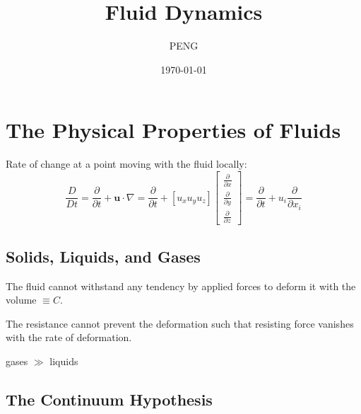\documentclass{article}
\title{Fluid Dynamics}
\author{PENG}
\date{\today}
\begin{document}
\maketitle
\tableofcontents
\section{The Physical Properties of Fluids}
\begin{definition}
    Rate of change at a point moving with the fluid locally:
    \begin{equation}
        \frac{D}{Dt} = \frac{\partial}{\partial t} + \boldsymbol{u} \cdot \nabla
        = \frac{\partial}{\partial t} + [u_{x} u_{y} u_{z}]
        \begin{bmatrix}
            \frac{\partial}{\partial x} \\
            \frac{\partial}{\partial y} \\
            \frac{\partial}{\partial z}
        \end{bmatrix}
        = \frac{\partial }{\partial t} + u_{i}\frac{\partial}{\partial x_{i}}
    \end{equation}
\end{definition}

\subsection{Solids, Liquids, and Gases}
\begin{assumption}
    The fluid cannot withstand any tendency by applied forces to deform it with the volume $\equiv C$.
\end{assumption}

\begin{definition}[resistance]
    The resistance cannot prevent the deformation such that resisting force vanishes with the rate of deformation.
\end{definition}

\begin{definition}[compressibility]
    gases $\gg$ liquids
\end{definition}

\begin{definition}[pressure]

\end{definition}

\subsection{The Continuum Hypothesis}

\printbibliography
\end{document}
